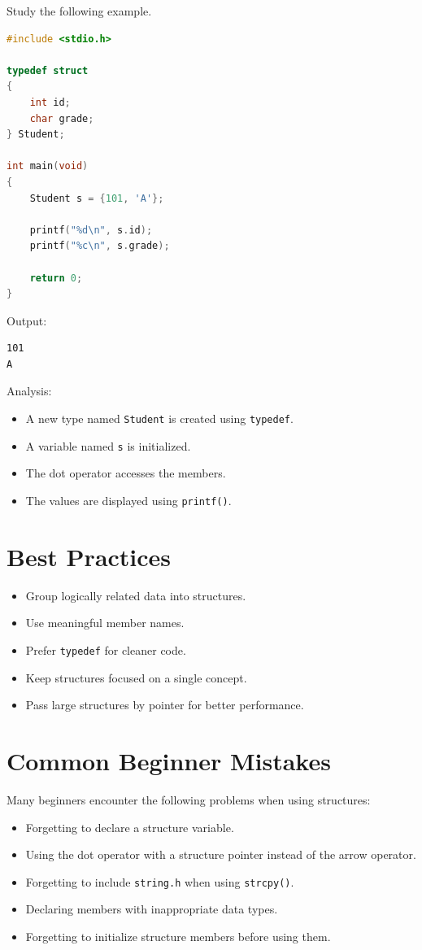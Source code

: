 \documentclass[12pt,openany]{book}
\begin{document}
Study the following example.

\begin{lstlisting}[language=C]
#include <stdio.h>

typedef struct
{
    int id;
    char grade;
} Student;

int main(void)
{
    Student s = {101, 'A'};

    printf("%d\n", s.id);
    printf("%c\n", s.grade);

    return 0;
}
\end{lstlisting}

Output:

\begin{lstlisting}
101
A
\end{lstlisting}

Analysis:

\begin{itemize}
    \item A new type named \texttt{Student} is created using \texttt{typedef}.
    \item A variable named \texttt{s} is initialized.
    \item The dot operator accesses the members.
    \item The values are displayed using \texttt{printf()}.
\end{itemize}

\section{Best Practices}

\begin{itemize}
    \item Group logically related data into structures.
    \item Use meaningful member names.
    \item Prefer \texttt{typedef} for cleaner code.
    \item Keep structures focused on a single concept.
    \item Pass large structures by pointer for better performance.
\end{itemize}
\section{Common Beginner Mistakes}

Many beginners encounter the following problems when using structures:

\begin{itemize}
    \item Forgetting to declare a structure variable.
    \item Using the dot operator with a structure pointer instead of the arrow operator.
    \item Forgetting to include \texttt{string.h} when using \texttt{strcpy()}.
    \item Declaring members with inappropriate data types.
    \item Forgetting to initialize structure members before using them.
\end{itemize}
\end{document}
